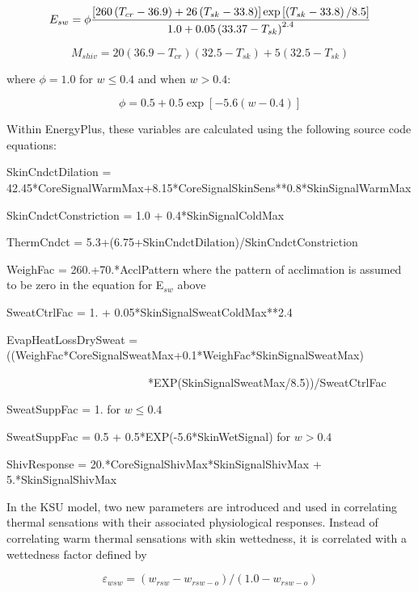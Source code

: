 \begin{equation}
E_{sw} = \phi \frac{\RB{260\PB{T_{cr} - 36.9} + 26\PB{T_{sk} - 33.8}} \exp\RB{\PB{T_{sk} - 33.8}/8.5}}{1.0 + 0.05\PB{33.37 - T_{sk}}^{2.4}}
\end{equation}

\begin{equation}
{M_{shiv}} = 20(36.9 - {T_{cr}})(32.5 - {T_{sk}}) + 5(32.5 - {T_{sk}})
\end{equation}

where \(\phi = 1.0\) for \(w \le 0.4\) and when \(w > 0.4\):

\begin{equation}
\phi = 0.5 + 0.5\exp [ - 5.6(w - 0.4)]
\end{equation}

Within EnergyPlus, these variables are calculated using the following source code equations:

SkinCndctDilation = 42.45*CoreSignalWarmMax+8.15*CoreSignalSkinSens**0.8*SkinSignalWarmMax

SkinCndctConstriction = 1.0 + 0.4*SkinSignalColdMax

ThermCndct = 5.3+(6.75+SkinCndctDilation)/SkinCndctConstriction

WeighFac = 260.+70.*AcclPattern where the pattern of acclimation is assumed to be zero in the equation for E\(_{sw}\) above

SweatCtrlFac = 1. + 0.05*SkinSignalSweatColdMax**2.4

EvapHeatLossDrySweat = ((WeighFac*CoreSignalSweatMax+0.1*WeighFac*SkinSignalSweatMax)

~~~~~~~~~~~~~~~~~~~~~~~~~*EXP(SkinSignalSweatMax/8.5))/SweatCtrlFac

SweatSuppFac = 1. for \(w \le 0.4\)

SweatSuppFac = 0.5 + 0.5*EXP(-5.6*SkinWetSignal) for \(w > 0.4\)

ShivResponse = 20.*CoreSignalShivMax*SkinSignalShivMax + 5.*SkinSignalShivMax

In the KSU model, two new parameters are introduced and used in correlating thermal sensations with their associated physiological responses. Instead of correlating warm thermal sensations with skin wettedness, it is correlated with a wettedness factor defined by

\begin{equation}
{\varepsilon_{wsw}} = ({w_{rsw}} - {w_{rsw - o}})/(1.0 - {w_{rsw - o}})
\end{equation}


